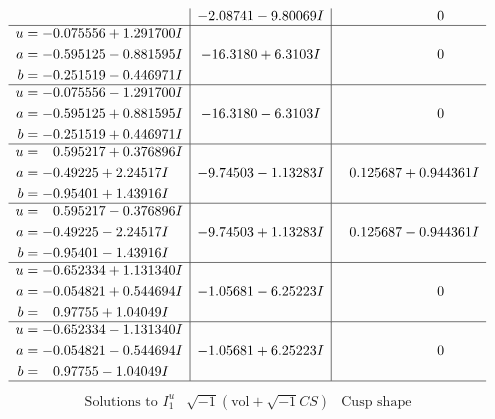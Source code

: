 \documentclass[1p]{elsarticle_modified}
\theoremstyle{definition}
\newcommand{\I}{\sqrt{-1}}
\begin{document}
$$\begin{array}{c|c|c}
 & -2.08741 - 9.80069 I & \phantom{-0.000000 } 0 \\ \hline\begin{aligned}
u &= -0.075556 + 1.291700 I \\
a &= -0.595125 - 0.881595 I \\
b &= -0.251519 - 0.446971 I\end{aligned}
 & -16.3180 + 6.3103 I & \phantom{-0.000000 } 0 \\ \hline\begin{aligned}
u &= -0.075556 - 1.291700 I \\
a &= -0.595125 + 0.881595 I \\
b &= -0.251519 + 0.446971 I\end{aligned}
 & -16.3180 - 6.3103 I & \phantom{-0.000000 } 0 \\ \hline\begin{aligned}
u &= \phantom{-}0.595217 + 0.376896 I \\
a &= -0.49225 + 2.24517 I \\
b &= -0.95401 + 1.43916 I\end{aligned}
 & -9.74503 - 1.13283 I & \phantom{-}0.125687 + 0.944361 I \\ \hline\begin{aligned}
u &= \phantom{-}0.595217 - 0.376896 I \\
a &= -0.49225 - 2.24517 I \\
b &= -0.95401 - 1.43916 I\end{aligned}
 & -9.74503 + 1.13283 I & \phantom{-}0.125687 - 0.944361 I \\ \hline\begin{aligned}
u &= -0.652334 + 1.131340 I \\
a &= -0.054821 + 0.544694 I \\
b &= \phantom{-}0.97755 + 1.04049 I\end{aligned}
 & -1.05681 - 6.25223 I & \phantom{-0.000000 } 0 \\ \hline\begin{aligned}
u &= -0.652334 - 1.131340 I \\
a &= -0.054821 - 0.544694 I \\
b &= \phantom{-}0.97755 - 1.04049 I\end{aligned}
 & -1.05681 + 6.25223 I & \phantom{-0.000000 } 0\\
 \hline 
 \end{array}$$\newpage$$\begin{array}{c|c|c}  
\text{Solutions to }I^u_{1}& \I (\text{vol} + \sqrt{-1}CS) & \text{Cusp shape}\\

\end{array}$$
\end{document}
